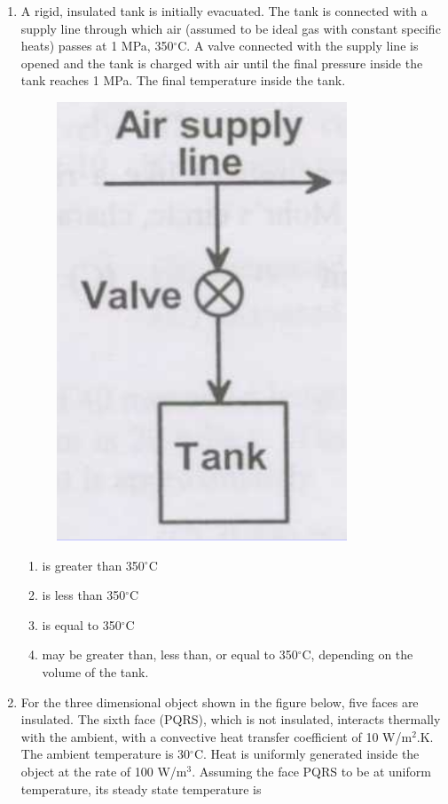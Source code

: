 \documentclass[journal,12pt,onecolumn]{IEEEtran}
\begin{document}
\begin{enumerate}[resume]
    \item A rigid, insulated tank is initially evacuated. The tank is connected with a supply line through which air (assumed to be ideal gas with constant specific heats) passes at 1 MPa, 350$^\circ$C. A valve connected with the supply line is opened and the tank is charged with air until the final pressure inside the tank reaches 1 MPa. The final temperature inside the tank.

          \begin{figure}[H]
              \centering
              \includegraphics[scale=0.3]{q49}
              \caption{}
              \label{q49}
          \end{figure}

          \begin{enumerate}
              \item is greater than 350$^\circ$C
              \item is less than 350$^\circ$C
              \item is equal to 350$^\circ$C
              \item may be greater than, less than, or equal to 350$^\circ$C, depending on the volume of the tank.
          \end{enumerate}

    \item For the three dimensional object shown in the figure below, five faces are insulated. The sixth face (PQRS), which is not insulated, interacts thermally with the ambient, with a convective heat transfer coefficient of 10 W/m$^2$.K. The ambient temperature is 30$^\circ$C. Heat is uniformly generated inside the object at the rate of 100 W/m$^3$. Assuming the face PQRS to be at uniform temperature, its steady state temperature is


\end{enumerate}
\end{document}

